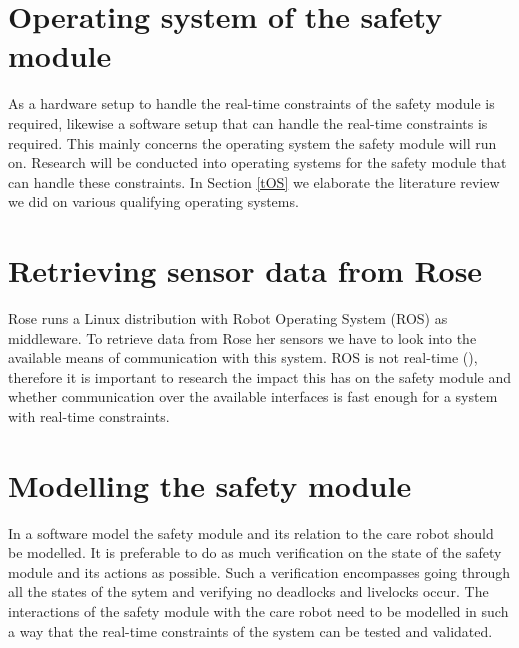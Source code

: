 \documentclass[12pt]{scrreprt}
\begin{document}
\section{Operating system of the safety module}
As a hardware setup to handle the real-time constraints of the safety module is required, likewise a software setup that can handle the real-time constraints is required. This mainly concerns the operating system the safety module will run on. Research will be conducted into operating systems for the safety module that can handle these constraints. In Section \ref{tOS} we elaborate the literature review we did on various qualifying operating systems.


\section{Retrieving sensor data from Rose}
\label{Retrieving sensor data from Rose}
Rose runs a Linux distribution with Robot Operating System (ROS) as middleware. To retrieve data from Rose her sensors we have to look into the available means of communication with this system. ROS is not real-time (\cite{why_is_ros_not_realtime}), therefore it is important to research the impact this has on the safety module and whether communication over the available interfaces is fast enough for a system with real-time constraints. %

\section{Modelling the safety module}
\label{Modelling the safety module}
In a software model the safety module and its relation to the care robot should be modelled. It is preferable to do as much verification on the state of the safety module and its actions as possible. Such a verification encompasses going through all the states of the sytem and verifying no deadlocks and livelocks occur.
The interactions of the safety module with the care robot need to be modelled in such a way that the real-time constraints of the system can be tested and validated. 
\par
\end{document}
